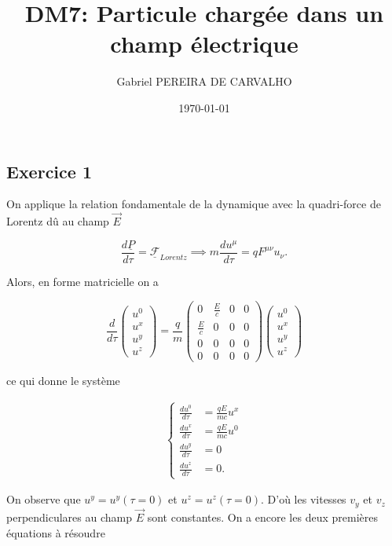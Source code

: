 \documentclass[french]{article}
\begin{document}
	\title{DM7: Particule chargée dans un champ électrique}
	\author{Gabriel PEREIRA DE CARVALHO}
	\date{\today}
	
	\maketitle
	
	\subsection*{Exercice 1}
	
	On applique la relation fondamentale de la dynamique avec la quadri-force de Lorentz dû au champ $\vec{E}$
	
	$$\frac{d \underline{P}}{d \tau} = \underline{\mathcal{F}}_{Lorentz} \implies m\frac{du^\mu}{d \tau} = q F^{\mu \nu} u_\nu.$$
	
	Alors, en forme matricielle on a
	
	$$ \frac{d}{d \tau} \begin{pmatrix}
	u^0 \\ u^x \\ u^y \\ u^z
	\end{pmatrix} = \frac{q}{m} \begin{pmatrix}
	0 & \frac{E}{c} & 0 & 0 \\
	\frac{E}{c} & 0 & 0 & 0 \\
	0 & 0 & 0 & 0 \\
	0 & 0 & 0 & 0
	\end{pmatrix}\begin{pmatrix}
	u^0 \\ u^x \\ u^y \\ u^z
	\end{pmatrix} $$
	
	ce qui donne le système
	
	\begin{align}
		\begin{cases}
		\frac{d u^0}{d \tau} &= \frac{qE}{mc} u^x \\
		\frac{d u^x}{d \tau} &= \frac{qE}{mc} u^0 \\
		\frac{d u^y}{d \tau} & = 0 \\
		\frac{d u^z}{d \tau} &= 0.
		\end{cases}
	\end{align}
	
	On observe que $u^y = u^y(\tau = 0)$ et $u^z = u^z(\tau = 0)$. D'où les vitesses $v_y$ et $v_z$ perpendiculares au champ $\vec{E}$ sont constantes. On a encore les deux premières équations à résoudre
	
\end{document}
